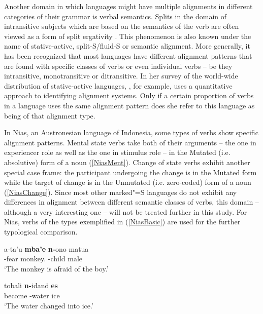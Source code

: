 Another domain in which languages might have multiple alignments in different categories of their grammar is verbal semantics. 
Splits in the domain of intransitive subjects which are based on the semantics of the verb are often viewed as a form of split ergativity \citep[70--83]{Dixon:1994}.
This phenomenon is also known under the name of stative-active, split-S/fluid-S or semantic alignment.
More generally, it has been recognized that most languages have different alignment patterns that are found with specific classes of verbs or even individual verbs -- be they intransitive, monotransitive or ditransitive. 
In her survey of the world-wide distribution of stative-active languages, \citet{Nichols:2008}, for example, uses a quantitative approach to identifying alignment systems. 
Only if a certain proportion of verbs in a language uses the same alignment pattern does she refer to this language as being of that alignment type.

In Nias, an Austronesian language of Indonesia, some types of verbs show specific alignment patterns. 
Mental state verbs take both of their arguments -- the one in experiencer role as well as the one in stimulus role -- in the Mutated (i.e. absolutive) form of a noun (\ref{NiasMent}). 
Change of state verbs exhibit another special case frame: the participant undergoing the change is in the Mutated form while the target of change is in the Unmutated (i.e. zero-coded) form of a noun (\ref{NiasChange}). 
Since most other marked"=S languages do not exhibit any differences in alignment between different semantic classes of verbs, this domain -- although a very interesting one -- will not be treated further in this study. 
For Nias, verbs of the types exemplified in (\ref{NiasBasic}) are used for the further typological comparison.


\begin{exe}
\ex {}
\begin{xlist}
\ex\label{NiasMent}\gll a-ta'u \textbf{mba'e} \textbf{n-}ono matua\\
\stat{}-fear monkey.\mut{} \mut{}-child male\\
\glt `The monkey is afraid of the boy.'

\ex\label{NiasChange}\gll  tobali \textbf{n-}idan\"o \textbf{es}\\
become \mut{}-water ice\\
\glt `The water changed into ice.'
\end{xlist}
\end{exe}

